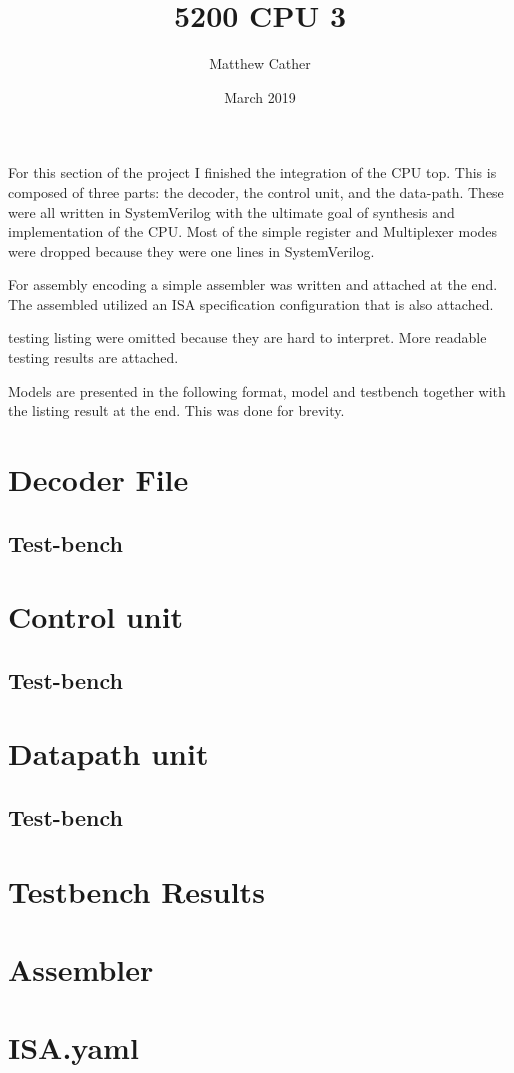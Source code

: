 \documentclass{article}
\title{5200 CPU 3}
\author{Matthew Cather}
\date{March 2019}
\begin{document}
\maketitle

For this section of the project I finished the integration of the CPU top. This is composed of three parts: the decoder, the control unit, and the data-path. These were all written in SystemVerilog with the ultimate goal of synthesis and implementation of the CPU. Most of the simple register and Multiplexer modes were dropped because they were one lines in SystemVerilog.

For assembly encoding a simple assembler was written and attached at the end. The assembled utilized an ISA specification configuration that is also attached.

testing listing were omitted because they are hard to interpret. More readable testing results are attached.

Models are presented in the following format, model and testbench together with the listing result at the end. This was done for brevity.

\tableofcontents
\clearpage

\section{Decoder File}

\subsection{Test-bench}


\section{Control unit}

\subsection{Test-bench}


\section{Datapath unit}

\subsection{Test-bench}


\section{Testbench Results}



\section{Assembler}

\section{ISA.yaml}

\end{document}
